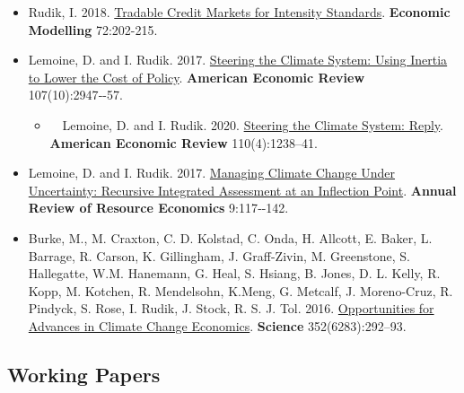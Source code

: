 \documentclass[12pt]{res} %
\begin{document}
\begin{resume}
\begin{itemize}
	\item[] Rudik, I. 2018. \href{https://www.sciencedirect.com/science/article/pii/S0264999317315651}{Tradable Credit Markets for Intensity Standards}. \textbf{Economic Modelling} 72:202-215.
	\item[] Lemoine, D. and I. Rudik. 2017.  \href{http://papers.ssrn.com/sol3/papers.cfm?abstract_id=2443594}{Steering the Climate System: Using Inertia to Lower the Cost of Policy}. \textbf{American Economic Review} 107(10):2947‐-57.
	\begin{itemize}
		\item[] \,\,\,\, Lemoine, D. and I. Rudik. 2020.  \href{http://papers.ssrn.com/sol3/papers.cfm?abstract_id=2443594}{Steering the Climate System: Reply}. \textbf{American Economic Review} 110(4):1238--41.
	\end{itemize}
	\item[] Lemoine, D. and I. Rudik. 2017. \href{https://papers.ssrn.com/sol3/papers.cfm?abstract_id=2862211}{Managing Climate Change Under Uncertainty: Recursive Integrated Assessment at an Inflection Point}.  \textbf{Annual Review of Resource Economics} 9:117‐-142.
	\item[]  Burke, M., M. Craxton, C. D. Kolstad, C. Onda, H. Allcott, E. Baker, L. Barrage, R. Carson, K. Gillingham, J. Graff-Zivin, M. Greenstone, S. Hallegatte, W.M. Hanemann, G. Heal, S. Hsiang, B. Jones, D. L. Kelly, R. Kopp, M. Kotchen, R. Mendelsohn, K.Meng, G. Metcalf, J. Moreno-Cruz, R. Pindyck, S. Rose, I. Rudik, J. Stock, R. S. J. Tol. 2016. \href{http://science.sciencemag.org/content/352/6283/292.abstract}{Opportunities for Advances in Climate Change Economics}. \textbf{Science} 352(6283):292--93.
\end{itemize} 


\vspace{-.2in}


\subsection{Working Papers}


\end{resume}
\end{document}
